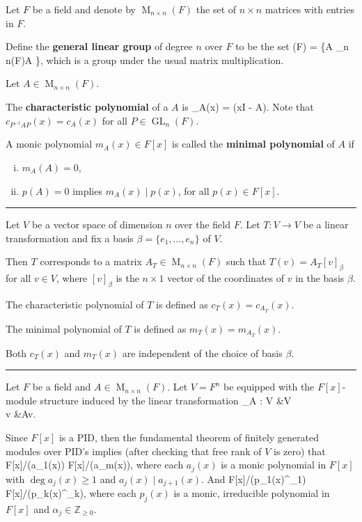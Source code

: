 \documentclass[12pt]{article}
\newcommand{\keyword}[1]{\textbf{#1}}
\def\[#1\]{\begin{align*}#1\end{align*}}
\newcommand{\sepline}{\rule{\textwidth}{0.4pt}}
\theoremstyle{definition}
\newcommand{\Z}{\mathbb{Z}}
\newcommand{\<}{\left\langle}
\renewcommand{\>}{\right\rangle}
\newcommand{\isom}{\cong}
\newcommand{\dsum}{\oplus}
\newcommand{\divides}{\mid}
\newcommand{\sqMat}[1]{\operatorname{M}_{#1 \times #1}}
\newcommand{\MnF}{\sqMat{n}(F)}
\newcommand{\GLn}{\operatorname{GL}_{n}}
\begin{document}
\newpage
Let $F$ be a field and denote by $\MnF$ the set of $n \times n$ matrices with entries in $F$.

Define the \keyword{general linear group} of degree $n$ over $F$ to be the set
\[
    \GLn(F) = \{A \in \MnF \mid \det A \},
\]
which is a group under the usual matrix multiplication.

Let $A \in \MnF$.

The \keyword{characteristic polynomial} of a $A$ is
\[
    c_A(x) = \det(xI - A).
\]
Note that $c_{P^{-1}AP}(x) = c_A(x)$ for all $P \in \GLn(F)$.

A monic polynomial $m_A(x) \in F[x]$ is called the \keyword{minimal polynomial} of $A$ if
\begin{enumerate}[(i)]
    \item $m_A(A) = 0$,
    \item $p(A) = 0$ implies $m_A(x) \divides p(x)$, for all $p(x) \in F[x]$.
\end{enumerate}

\sepline

Let $V$ be a vector space of dimension $n$ over the field $F$. Let $T : V \to V$ be a linear transformation and fix a basis $\beta = \{e_1, \dots, e_n\}$ of $V$.

Then $T$ corresponds to a matrix $A_T \in \MnF$ such that $T(v) = A_T[v]_\beta$ for all $v \in V$, where $[v]_\beta$ is the $n \times 1$ vector of the coordinates of $v$ in the basis $\beta$.

The characteristic polynomial of $T$ is defined as $c_T(x) = c_{A_T}(x)$.

The minimal polynomial of $T$ is defined as $m_T(x) = m_{A_T}(x)$.

Both $c_T(x)$ and $m_T(x)$ are independent of the choice of basis $\beta$.

\sepline

Let $F$ be a field and $A \in \MnF$. Let $V = F^n$ be equipped with the $F[x]$-module structure induced by the linear transformation
\[
    T_A : V &\to V \\
    v &\mapsto Av.
\]

Since $F[x]$ is a PID, then the fundamental theorem of finitely generated modules over PID's implies (after checking that free rank of $V$ is zero) that
\[
    V \isom F[x]/(a_1(x)) \dsum \cdots \dsum F[x]/(a_m(x)),
\]
where each $a_j(x)$ is a monic polynomial in $F[x]$ with $\deg a_j(x) \geq 1$ and $a_j(x) \divides a_{j+1}(x)$. And
\[
    V \isom F[x]/(p_1(x)^{\alpha_1}) \dsum \cdots \dsum F[x]/(p_k(x)^{\alpha_k}),
\]
where each $p_j(x)$ is a monic, irreducible polynomial in $F[x]$ and $\alpha_j \in \Z_{\geq 0}$.
\end{document}
